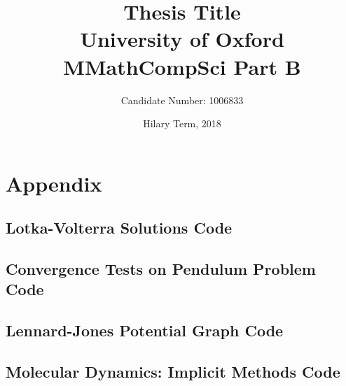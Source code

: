 \documentclass[a4paper, 12pt]{article}
\title{
	{Thesis Title}\\
	{\large University of Oxford}\\
	{\large MMathCompSci Part B}
}
\author{Candidate Number: 1006833}
\date{Hilary Term, 2018}
\numberwithin{equation}{section}
\numberwithin{table}{section}
\numberwithin{figure}{section}
\begin{document}
	\maketitle

	\newpage
	\tableofcontents

	\newpage
 	

	\newpage
 	

	\newpage
	

	\newpage
	

	\newpage
	

	\newpage
	\appendix
	\section{Appendix}
	
	\subsection{ Lotka-Volterra Solutions Code}
	

	\newpage
	\subsection{Convergence Tests on Pendulum Problem Code}
	
	

	\newpage
	\subsection{Lennard-Jones Potential Graph Code}
	

	\newpage
	\subsection{Molecular Dynamics: Implicit Methods Code}
	
	
	
	
	
	
	\BlankLine
	\BlankLine
	

	\newpage
	
	
\end{document}
